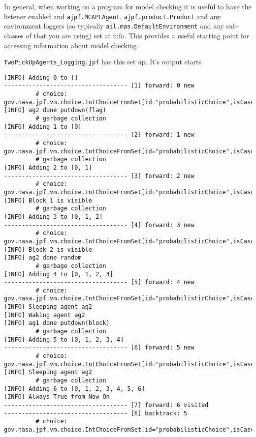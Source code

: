 \begin{sloppypar}
In general, when working on a program for model checking it is useful to have the  listener enabled and \texttt{ajpf.MCAPLAgent}, \texttt{ajpf.product.Product} and any environment loggers (so typically \texttt{ail.mas.DefaultEnvironment} and any sub-classes of that you are using) set at info.   This provides a useful starting point for accessing information about model checking.
\end{sloppypar}

\texttt{TwoPickUpAgents\_Logging.jpf} has this set up.  It's output starts

\begin{verbatim}
[INFO] Adding 0 to []
----------------------------------- [1] forward: 0 new
		 # choice: gov.nasa.jpf.vm.choice.IntChoiceFromSet[id="probabilisticChoice",isCascaded:false,>0,1]
[INFO] ag2 done putdown(flag)
		 # garbage collection
[INFO] Adding 1 to [0]
----------------------------------- [2] forward: 1 new
		 # choice: gov.nasa.jpf.vm.choice.IntChoiceFromSet[id="probabilisticChoice",isCascaded:false,>0,1]
		 # garbage collection
[INFO] Adding 2 to [0, 1]
----------------------------------- [3] forward: 2 new
		 # choice: gov.nasa.jpf.vm.choice.IntChoiceFromSet[id="probabilisticChoice",isCascaded:false,>0,1]
[INFO] Block 1 is visible
		 # garbage collection
[INFO] Adding 3 to [0, 1, 2]
----------------------------------- [4] forward: 3 new
		 # choice: gov.nasa.jpf.vm.choice.IntChoiceFromSet[id="probabilisticChoice",isCascaded:false,>0,1]
[INFO] Block 2 is visible
[INFO] ag2 done random
		 # garbage collection
[INFO] Adding 4 to [0, 1, 2, 3]
----------------------------------- [5] forward: 4 new
		 # choice: gov.nasa.jpf.vm.choice.IntChoiceFromSet[id="probabilisticChoice",isCascaded:false,>0,1]
[INFO] Sleeping agent ag2
[INFO] Waking agent ag2
[INFO] ag1 done putdown(block)
		 # garbage collection
[INFO] Adding 5 to [0, 1, 2, 3, 4]
----------------------------------- [6] forward: 5 new
		 # choice: gov.nasa.jpf.vm.choice.IntChoiceFromSet[id="probabilisticChoice",isCascaded:false,>0,1]
[INFO] Sleeping agent ag2
		 # garbage collection
[INFO] Adding 6 to [0, 1, 2, 3, 4, 5, 6]
[INFO] Always True from Now On
----------------------------------- [7] forward: 6 visited
----------------------------------- [6] backtrack: 5
		 # choice: gov.nasa.jpf.vm.choice.IntChoiceFromSet[id="probabilisticChoice",isCascaded:false,0,>1]

\end{verbatim}
